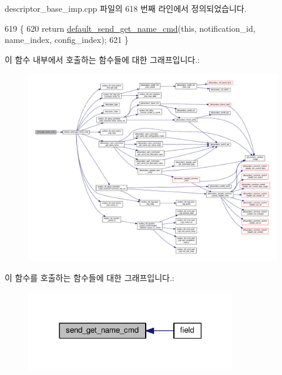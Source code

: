 descriptor\+\_\+base\+\_\+imp.\+cpp 파일의 618 번째 라인에서 정의되었습니다.


\begin{DoxyCode}
619 \{
620     \textcolor{keywordflow}{return} \hyperlink{classavdecc__lib_1_1descriptor__base__imp_a92f2c88d261418872a496a8145800751}{default\_send\_get\_name\_cmd}(\textcolor{keyword}{this}, notification\_id, name\_index, 
      config\_index);
621 \}
\end{DoxyCode}


이 함수 내부에서 호출하는 함수들에 대한 그래프입니다.\+:
\nopagebreak
\begin{figure}[H]
\begin{center}
\leavevmode
\includegraphics[width=350pt]{classavdecc__lib_1_1descriptor__base__imp_a4e8ce103baabbd5fc07deabfb95f791a_cgraph}
\end{center}
\end{figure}




이 함수를 호출하는 함수들에 대한 그래프입니다.\+:
\nopagebreak
\begin{figure}[H]
\begin{center}
\leavevmode
\includegraphics[width=261pt]{classavdecc__lib_1_1descriptor__base__imp_a4e8ce103baabbd5fc07deabfb95f791a_icgraph}
\end{center}
\end{figure}


